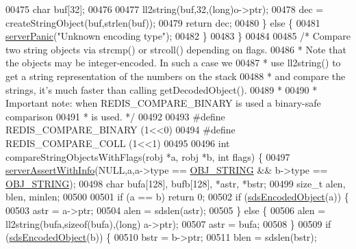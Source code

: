 \begin{DoxyCode}
{00475         \textcolor{keywordtype}{char} buf[32];
00476 
00477         ll2string(buf,32,(\textcolor{keywordtype}{long})o->ptr);
00478         dec = createStringObject(buf,strlen(buf));
00479         \textcolor{keywordflow}{return} dec;
00480     \} \textcolor{keywordflow}{else} \{
00481         \hyperlink{server_8h_a11cc378e7778a830b41240578de3b204}{serverPanic}(\textcolor{stringliteral}{"Unknown encoding type"});
00482     \}
00483 \}
00484 
00485 \textcolor{comment}{/* Compare two string objects via strcmp() or strcoll() depending on flags.}
00486 \textcolor{comment}{ * Note that the objects may be integer-encoded. In such a case we}
00487 \textcolor{comment}{ * use ll2string() to get a string representation of the numbers on the stack}
00488 \textcolor{comment}{ * and compare the strings, it's much faster than calling getDecodedObject().}
00489 \textcolor{comment}{ *}
00490 \textcolor{comment}{ * Important note: when REDIS\_COMPARE\_BINARY is used a binary-safe comparison}
00491 \textcolor{comment}{ * is used. */}
00492 
00493 \textcolor{preprocessor}{#}\textcolor{preprocessor}{define} \textcolor{preprocessor}{REDIS\_COMPARE\_BINARY} \textcolor{preprocessor}{(}1\textcolor{preprocessor}{<<}0\textcolor{preprocessor}{)}
00494 \textcolor{preprocessor}{#}\textcolor{preprocessor}{define} \textcolor{preprocessor}{REDIS\_COMPARE\_COLL} \textcolor{preprocessor}{(}1\textcolor{preprocessor}{<<}1\textcolor{preprocessor}{)}
00495 
00496 \textcolor{keywordtype}{int} compareStringObjectsWithFlags(robj *a, robj *b, \textcolor{keywordtype}{int} flags) \{
00497     \hyperlink{server_8h_a7308f76cbff9a8d3797fe78190b91282}{serverAssertWithInfo}(NULL,a,a->type == \hyperlink{server_8h_a65236ea160f69cdef33ec942092af88f}{OBJ\_STRING} && b->type == 
      \hyperlink{server_8h_a65236ea160f69cdef33ec942092af88f}{OBJ\_STRING});
00498     \textcolor{keywordtype}{char} bufa[128], bufb[128], *astr, *bstr;
00499     size\_t alen, blen, minlen;
00500 
00501     \textcolor{keywordflow}{if} (a == b) \textcolor{keywordflow}{return} 0;
00502     \textcolor{keywordflow}{if} (\hyperlink{server_8h_afcfb5bd97af52d1dbce331745cae030c}{sdsEncodedObject}(a)) \{
00503         astr = a->ptr;
00504         alen = sdslen(astr);
00505     \} \textcolor{keywordflow}{else} \{
00506         alen = ll2string(bufa,\textcolor{keyword}{sizeof}(bufa),(\textcolor{keywordtype}{long}) a->ptr);
00507         astr = bufa;
00508     \}
00509     \textcolor{keywordflow}{if} (\hyperlink{server_8h_afcfb5bd97af52d1dbce331745cae030c}{sdsEncodedObject}(b)) \{
00510         bstr = b->ptr;
00511         blen = sdslen(bstr);
}
\end{DoxyCode}
